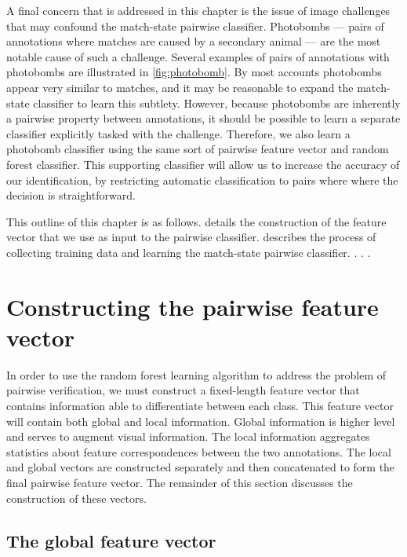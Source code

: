 A final concern that is addressed in this chapter is the issue of image
  challenges that may confound the match-state pairwise classifier.
Photobombs --- pairs of annotations where matches are caused by a secondary
  animal --- are the most notable cause of such a challenge.
Several examples of pairs of annotations with photobombs are illustrated in
  \cref{fig:photobomb}.
By most accounts photobombs appear very similar to matches, and it may be
  reasonable to expand the match-state classifier to learn this subtlety.
However, because photobombs are inherently a pairwise property between
  annotations, it should be possible to learn a separate classifier explicitly
  tasked with the challenge.
Therefore, we also learn a photobomb classifier using the same sort of
  pairwise feature vector and random forest classifier.
This supporting classifier will allow us to increase the accuracy of our
  identification, by restricting automatic classification to pairs where where
  the decision is straightforward.


This outline of this chapter is as follows.
 details the construction of the feature vector that we use
  as input to the pairwise classifier.
 describes the process of collecting training data and
  learning the match-state pairwise classifier.
 .
 .
 .


\section{Constructing the pairwise feature vector}

In order to use the random forest learning algorithm to address the problem of
  pairwise verification, we must construct a fixed-length feature vector that
  contains information able to differentiate between each class.
This feature vector will contain both global and local information.
Global information is higher level and serves to augment visual information.
The local information aggregates statistics about feature correspondences
  between the two annotations.
The local and global vectors are constructed separately and then concatenated
  to form the final pairwise feature vector.
The remainder of this section discusses the construction of these vectors.

\subsection{The global feature vector}

